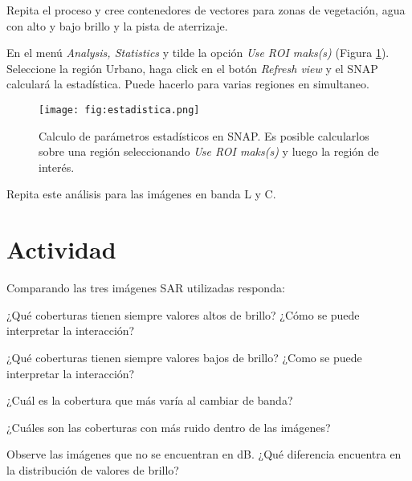 Repita el proceso y cree contenedores de vectores para zonas de vegetación, agua con alto y bajo brillo y la pista de aterrizaje.

En el menú \emph{Analysis, Statistics} y tilde la opción \emph{Use ROI maks(s)} (Figura \ref{fig:estadistica}). Seleccione la región Urbano, haga click en el botón \emph{Refresh view} y el SNAP calculará la estadística. Puede hacerlo para varias regiones en simultaneo.


\begin{figure}[h!]
    \centering
    \texttt{[image: fig:estadistica.png]}
    \caption{Calculo de parámetros estadísticos en SNAP. Es posible calcularlos sobre una región seleccionando \emph{Use ROI maks(s)} y luego la región de interés.}
    \label{fig:estadistica}
\end{figure}

Repita este análisis para las imágenes en banda L y C.

\section{Actividad}

Comparando las tres imágenes SAR utilizadas responda:

\begin{que}
    ¿Qué coberturas tienen siempre valores altos de brillo? ¿Cómo se puede interpretar la interacción?
\end{que}

\begin{que}
    ¿Qué coberturas tienen siempre valores bajos de brillo? ¿Como se puede interpretar la interacción?
\end{que}

\begin{que}
    ¿Cuál es la cobertura que más varía al cambiar de banda?
\end{que}

\begin{que}
    ¿Cuáles son las coberturas con más ruido dentro de las imágenes?
\end{que}

\begin{que}
    Observe las imágenes que no se encuentran en dB. ¿Qué diferencia encuentra en la distribución de valores de brillo?
\end{que}
